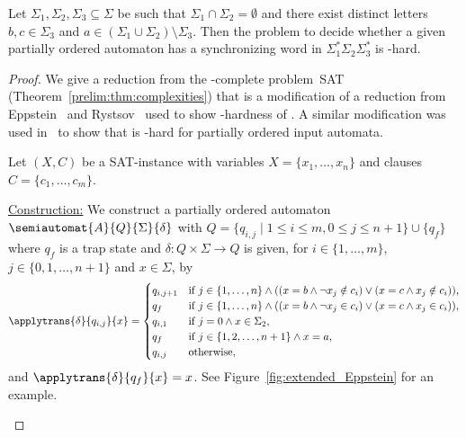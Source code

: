\begin{lemma}\label{constrinput:pto:lem:Sigma1starSigma2Sigma3star}
	Let $\Sigma_1, \Sigma_2, \Sigma_3 \subseteq \Sigma$
	be such that $\Sigma_1 \cap \Sigma_2 = \emptyset$ and
	there exist distinct letters $b,c \in \Sigma_{3}$
	and $a \in (\Sigma_1 \cup \Sigma_2) \setminus \Sigma_3$.
	Then the problem to decide whether a given 
	partially ordered automaton has a synchronizing word in $\Sigma_1^*\Sigma_2\Sigma_3^*$
	is \NP-hard.
\end{lemma}
\begin{proof}	
	We give a reduction from the \NP-complete problem~{\sc SAT} (Theorem~\ref{prelim:thm:complexities})
	that is a modification of a reduction from Eppstein~\cite{Eppstein90} 
	and Rystsov~\cite{Rys80}
	used to show \NP-hardness of \DFASWS. A similar modification was used in~\cite[Thm.~4]{Ryzhikov19a}
	to show that \SFS is \NP-hard for partially ordered 
	input automata.	
		
	Let $(X,C)$ be a {\sc SAT}-instance with variables $X = \{x_1, \ldots, x_n\}$
	and clauses $C = \{c_1, \ldots, c_m\}$.
	
\medskip 
\noindent\underline{Construction:} We construct a partially ordered automaton $\semiautomat{A}{Q}{\Sigma}{\delta}$
with $Q = \{ q_{i,j} \mid 1 \le i \le m, 0 \le j \le n + 1 \}\cup \{q_f\}$
where $q_f$ is a trap state and $\delta \colon Q \times \Sigma \to Q$  is given, 
for $i \in \{1,\ldots,m\}$, $j \in \{0,1,\ldots,n+1\}$ and $x \in \Sigma$, by 
\[
\applytrans{\delta}{q_{i,j}}{x} = \begin{cases}
q_{i, j + 1} & \mbox{if } j \in \{1,\ldots, n\} \land ( ( x = b \land \neg x_j \notin c_i ) \lor ( x= c \land  x_j \notin c_i ) ), \\
q_f          & \mbox{if } j \in \{1,\ldots, n\} \land ( ( x = b \land \neg x_j \in c_i ) \lor ( x = c \land    x_j \in c_i ) ), \\ 
q_{i,1}      & \mbox{if } j = 0 \land x \in \Sigma_2, \\ 
q_f          & \mbox{if } j \in \{1,2,\ldots,n+1\} \land x = a, \\
q_{i,j}      & \mbox{otherwise},
\end{cases}
\]
and $\applytrans{\delta}{q_f}{x} = x$. See Figure~\ref{fig:extended_Eppstein} for an example.

	\begin{figure}[ht]
	\centering
		\begin{tikzpicture}[transform shape,scale=0.8,shorten >=1pt,node distance=2.1cm and 3.5cm,on grid,auto, state/.style={circle, draw, blur shadow,fill=white,minimum size=1.3cm, fill=black!5, thick}] %
			

\end{tikzpicture}
\end{figure}
\end{proof}
